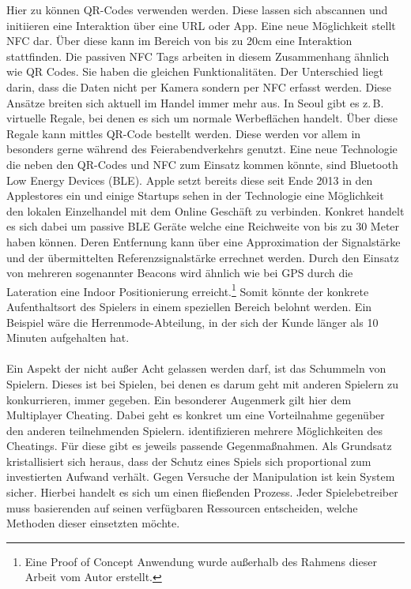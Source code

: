 Hier zu können QR-Codes verwenden werden. Diese lassen sich abscannen und initiieren eine Interaktion über eine URL oder App. Eine neue Möglichkeit stellt NFC dar.\cite{Rashid.2006b} Über diese kann im Bereich von bis zu 20cm eine Interaktion stattfinden.\cite{Coulton.2006} Die passiven NFC Tags arbeiten in diesem Zusammenhang ähnlich wie QR Codes. Sie haben die gleichen Funktionalitäten. Der Unterschied liegt darin, dass die Daten nicht per Kamera sondern per NFC erfasst werden. Diese Ansätze breiten sich aktuell im Handel immer mehr aus.\cite{Heinemann.2014} In Seoul gibt es z.\,B. virtuelle Regale, bei denen es sich um normale Werbeflächen handelt. Über diese Regale kann mittles QR-Code bestellt werden.\cite{Tesco.2012} Diese werden vor allem in besonders gerne während des Feierabendverkehrs genutzt.
Eine neue Technologie die neben den QR-Codes und NFC zum Einsatz kommen könnte, sind Bluetooth Low Energy Devices (BLE). Apple setzt bereits diese seit Ende 2013 in den Applestores ein und einige Startups sehen in der Technologie eine Möglichkeit den lokalen Einzelhandel mit dem Online Geschäft zu verbinden. Konkret handelt es sich dabei um passive BLE Geräte welche eine Reichweite von bis zu 30 Meter haben können. Deren Entfernung kann über eine Approximation der Signalstärke und der übermittelten Referenzsignalstärke errechnet werden.\cite{Do.2013} Durch den Einsatz von mehreren sogenannter Beacons wird ähnlich wie bei GPS durch die Lateration eine Indoor Positionierung erreicht.\footnote{Eine Proof of Concept Anwendung wurde außerhalb des Rahmens dieser Arbeit vom Autor erstellt.} Somit könnte der konkrete Aufenthaltsort des Spielers in einem speziellen Bereich belohnt werden. Ein Beispiel wäre die Herrenmode-Abteilung, in der sich der Kunde länger als 10 Minuten aufgehalten hat.
\\\\
Ein Aspekt der nicht außer Acht gelassen werden darf, ist das Schummeln von Spielern. Dieses ist bei Spielen, bei denen es darum geht mit anderen Spielern zu konkurrieren, immer  gegeben.\cite{Consalvo.2005} Ein besonderer Augenmerk gilt hier dem Multiplayer Cheating. Dabei geht es konkret um eine Vorteilnahme gegenüber den anderen teilnehmenden Spielern.
\textcite{Yan.2005} identifizieren mehrere Möglichkeiten des Cheatings. Für diese gibt es jeweils passende Gegenmaßnahmen. Als Grundsatz kristallisiert sich heraus, dass der Schutz eines Spiels sich proportional zum investierten Aufwand verhält. Gegen Versuche der Manipulation ist kein System sicher. Hierbei handelt es sich um einen fließenden Prozess.
Jeder Spielebetreiber muss basierenden auf seinen verfügbaren Ressourcen entscheiden, welche Methoden dieser einsetzten möchte. 

